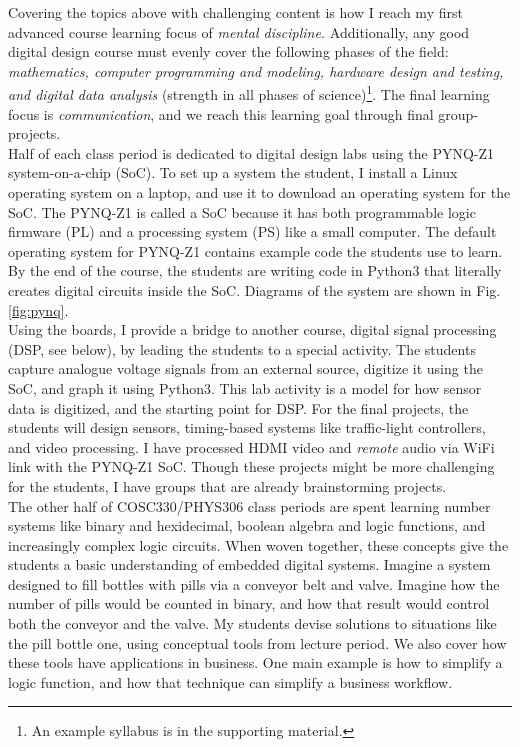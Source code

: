 \documentclass[../../../main.tex]{subfiles}
\begin{document}
Covering the topics above with challenging content is how I reach my first advanced course learning focus of \textit{mental discipline.}  Additionally, any good digital design course must evenly cover the following phases of the field: \textit{mathematics, computer programming and modeling, hardware design and testing, and digital data analysis} (strength in all phases of science)\footnote{An example syllabus is in the supporting material.}.  The final learning focus is \textit{communication}, and we reach this learning goal through final group-projects.
\\
\vspace{0.15cm}
Half of each class period is dedicated to digital design labs using the PYNQ-Z1 system-on-a-chip (SoC).  To set up a system the student, I install a Linux operating system on a laptop, and use it to download an operating system for the SoC.  The PYNQ-Z1 is called a SoC because it has both programmable logic firmware (PL) and a processing system (PS) like a small computer.  The default operating system for PYNQ-Z1 contains example code the students use to learn.  By the end of the course, the students are writing code in Python3 that literally creates digital circuits inside the SoC.  Diagrams of the system are shown in Fig. \ref{fig:pynq}.
\\
\vspace{0.15cm}
Using the boards, I provide a bridge to another course, digital signal processing (DSP, see below), by leading the students to a special activity.  The students capture analogue voltage signals from an external source, digitize it using the SoC, and graph it using Python3.  This lab activity is a model for how sensor data is digitized, and the starting point for DSP.  For the final projects, the students will design sensors, timing-based systems like traffic-light controllers, and video processing.  I have processed HDMI video and \textit{remote} audio via WiFi link with the PYNQ-Z1 SoC.  Though these projects might be more challenging for the students, I have groups that are already brainstorming projects.
\\
\vspace{0.15cm}
The other half of COSC330/PHYS306 class periods are spent learning number systems like binary and hexidecimal, boolean algebra and logic functions, and increasingly complex logic circuits.  When woven together, these concepts give the students a basic understanding of embedded digital systems.  Imagine a system designed to fill bottles with pills via a conveyor belt and valve.  Imagine how the number of pills would be counted in binary, and how that result would control both the conveyor and the valve.  My students devise solutions to situations like the pill bottle one, using conceptual tools from lecture period.  We also cover how these tools have applications in business.  One main example is how to simplify a logic function, and how that technique can simplify a business workflow.
\\
\vspace{0.15cm}
\end{document}
